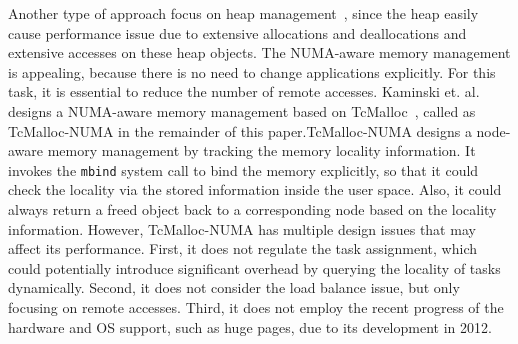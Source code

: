 Another type of approach focus on heap management~\cite{tcmallocnew, }, since the heap easily cause performance issue due to extensive allocations and deallocations and extensive accesses on these heap objects. The NUMA-aware memory management is appealing, because there is no need to change applications explicitly. For this task, it is essential to reduce the number of remote accesses. Kaminski et. al. designs a NUMA-aware memory management based on TcMalloc~\cite{tcmallocnew}, called as TcMalloc-NUMA in the remainder of this paper.TcMalloc-NUMA designs a node-aware memory management by tracking the memory locality information. It invokes the \texttt{mbind} system call to bind the memory explicitly, so that it could check the locality via the stored information inside the user space. Also, it could always return a freed object back to a corresponding node based on the locality information. However, TcMalloc-NUMA has multiple design issues that may affect its performance. First, it does not regulate the task assignment, which could potentially introduce significant overhead by querying the locality of tasks dynamically. Second, it does not consider the load balance issue, but only focusing on remote accesses. Third, it does not employ the recent progress of the hardware and OS support, such as huge pages, due to its development in 2012. 


\begin{comment}

It first assumes that a memory block is belong to the same node for its allocating thread. However, this assumption is invalid, and is also contradict with the first-touch policy of the OS. 

If there is no such assumption, we will expect that the OS will provide an efficient API to query the locality of a page. However, no such APIs exist in both Linux and Windows. 

It checks the physical memory usage to determine the future allocations of the same node or the re-use of a remote node. But that is very slow by checking meminfo. 

In the end, it utilizes the mbind to bind the memory to a node specifically. 
	
\end{comment}
	 


